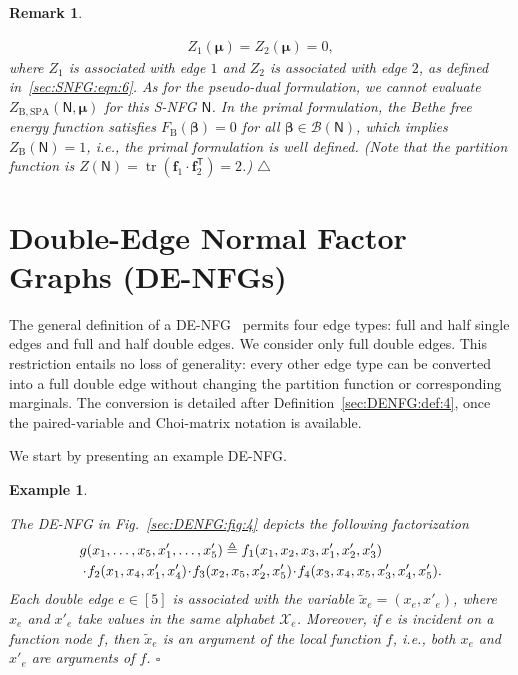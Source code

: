 \documentclass[journal]{IEEEtran}
\newcommand{\add}[1]{{\color{black}#1}}
\newtheorem{example}[theorem]{Example}
\newtheorem{remark}[theorem]{Remark}
\newcommand{\manualendsymbol}[1]{%
  \leavevmode\unskip\penalty9999\hbox{}\nobreak\hfill
  \quad\hbox{#1}}
\newcommand{\eexample}{\manualendsymbol{\ensuremath{\square}}}
\newcommand{\eremark}{\manualendsymbol{\ensuremath{\triangle}}}
\newcommand{\vect}[1]{ \bm{#1} }
\newcommand{\set}[1]{\mathcal{#1}}
\newcommand{\beli}{\beta}
\newcommand{\vbeli}{ \vect{\beli} }
\newcommand{\sfN}{ \mathsf{N} }
\newcommand{\FB}{F_{ \mathrm{B} }}
\newcommand{\ZB}{Z_{ \mathrm{B} }}
\newcommand{\tran}{\mathsf{T}}
\newcommand{\vmu}{ \vect{ \mu } }
\newcommand{\graphN}{ \mathsf{N} }
\newcommand{\defeq}{ \triangleq }
\newcommand{\LMP}{ \set{B} }
\newcommand{\ZBSPA}{ Z_{\mathrm{B,SPA}} }
\newcommand{\matr}[1]{\vect{#1}}
\newcommand{\tx}{ \tilde{x} }
\newcommand*{\ie}{\textit{i.e.}}
\begin{document}
\begin{remark}
\begin{enumerate}
\begin{align*}
            Z_{1}(\vmu)
            = Z_{2}(\vmu) = 0,
          \end{align*}
          where $ Z_{1} $ is associated with edge $ 1 $ and $ Z_{2} $ is
          associated with edge $ 2 $, as defined in~\eqref{sec:SNFG:eqn:6}. As
          for the pseudo-dual formulation, we cannot evaluate
          $ \ZBSPA(\graphN,\vmu) $ for this S-NFG $ \graphN $.  \add{In the
            primal formulation}, the Bethe free energy function satisfies
          $ \FB(\vbeli) = 0 $ for all $ \vbeli \in \LMP(\graphN) $, which
          implies $ \ZB(\graphN) = 1 $, \ie, the primal formulation is well
          defined. (Note that the partition function is
          $ Z(\sfN) = \operatorname{tr}(\matr{f}_{1} \cdot
            \matr{f}_{2}^{\tran}) = 2 $.)\eremark

  \end{enumerate}
\end{remark}

\section{Double-Edge Normal Factor Graphs (DE-NFGs)}
\label{sec:DENFG}

\add{The general definition of a DE-NFG~\cite{Cao2017} permits four edge
  types: full and half single edges and full and half double edges. We
  consider only full double edges. This restriction entails no loss of
  generality: every other edge type can be converted into a full double edge
  without changing the partition function or corresponding marginals. The
  conversion is detailed after Definition~\ref{sec:DENFG:def:4}, once the
  paired-variable and Choi-matrix notation is available.}

We start by presenting an example DE-NFG.

\begin{example}
  \label{sec:DENFG:exp:1}

  
  The DE-NFG in Fig.~\ref{sec:DENFG:fig:4} depicts the following factorization
  \begin{align*}
    \hspace{-0.25 cm} & g(x_{1},\ldots,x_{5},x_{1}',\ldots,x_{5}')
    \defeq f_{1}(x_{1},x_{2},x_{3},x_{1}',x_{2}',x_{3}')                                                                                                                  \\
                      & \cdot \! f_{2}(x_{1},x_{4},x_{1}',x_{4}') \! \cdot \! f_{3}(x_{2},x_{5},x_{2}',x_{5}') \! \cdot \! f_{4}(x_{3},x_{4},x_{5},x_{3}',x_{4}',x_{5}').
  \end{align*}
  \add{Each double edge $e \in [5]$ is associated with the variable}
  $\tx_e = (x_e, x'_e)$, where $x_e$ and $x'_e$ take values in the same
  alphabet $\set{X}_e$. Moreover, if $e$ is incident on a function node
  $f$, then $\tx_e$ is an argument of the local function $f$, \ie, both
  $x_e$ and $x'_e$ are arguments of $f$.
  \eexample
\end{example}
\end{document}
